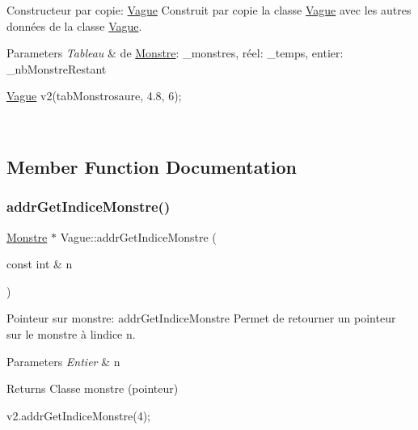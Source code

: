 Constructeur par copie\+: \hyperlink{classVague}{Vague} Construit par copie la classe \hyperlink{classVague}{Vague} avec les autres données de la classe \hyperlink{classVague}{Vague}. 


\begin{DoxyParams}{Parameters}
{\em Tableau} & de \hyperlink{classMonstre}{Monstre}\+: \+\_\+monstres, réel\+: \+\_\+temps, entier\+: \+\_\+nb\+Monstre\+Restant 
\begin{DoxyCode}
\hyperlink{classVague}{Vague} v2(tabMonstrosaure, 4.8, 6);
\end{DoxyCode}
 \\
\hline
\end{DoxyParams}


\subsection{Member Function Documentation}
\mbox{\label{classVague_ab177d208c78c64cb636e3746431a4d16}} 
\subsubsection{\texorpdfstring{addr\+Get\+Indice\+Monstre()}{addrGetIndiceMonstre()}}
{\footnotesize\ttfamily \hyperlink{classMonstre}{Monstre} $\ast$ Vague\+::addr\+Get\+Indice\+Monstre (\begin{DoxyParamCaption}\item[{const int \&}]{n }\end{DoxyParamCaption})}



Pointeur sur monstre\+: addr\+Get\+Indice\+Monstre Permet de retourner un pointeur sur le monstre à l\textquotesingle{}indice n. 


\begin{DoxyParams}{Parameters}
{\em Entier} & n \\
\hline
\end{DoxyParams}
\begin{DoxyReturn}{Returns}
Classe monstre (pointeur) 
\begin{DoxyCode}
v2.addrGetIndiceMonstre(4);
\end{DoxyCode}
 
\end{DoxyReturn}
\mbox{\label{classVague_adec201ad91a86f65bf6aaf0ddb73bd20}} 
